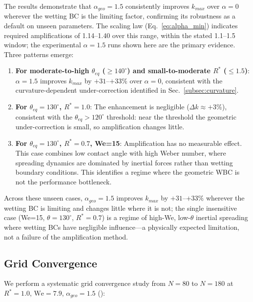 The results demonstrate that $\alpha_{geo}=1.5$ consistently improves $k_{max}$ over $\alpha=0$ wherever the wetting BC is the limiting factor, confirming its robustness as a default on unseen parameters. The scaling law (Eq.~\ref{eq:alpha_min}) indicates required amplifications of 1.14--1.40 over this range, within the stated 1.1--1.5 window; the experimental $\alpha=1.5$ runs shown here are the primary evidence. Three patterns emerge:

\begin{enumerate}
    \item \textbf{For moderate-to-high $\theta_{eq}$ ($\geq 140^\circ$) and small-to-moderate $R^*$ ($\leq 1.5$)}: $\alpha=1.5$ improves $k_{max}$ by $+31$--$+33\%$ over $\alpha=0$, consistent with the curvature-dependent under-correction identified in Sec.~\ref{subsec:curvature}.
    \item \textbf{For $\theta_{eq}=130^\circ$, $R^*=1.0$}: The enhancement is negligible ($\Delta k \approx +3\%$), consistent with the $\theta_{eq}>120^\circ$ threshold: near the threshold the geometric under-correction is small, so amplification changes little.
    \item \textbf{For $\theta_{eq}=130^\circ$, $R^*=0.7$, We=15}: Amplification has no measurable effect. This case combines low contact angle with high Weber number, where spreading dynamics are dominated by inertial forces rather than wetting boundary conditions. This identifies a regime where the geometric WBC is not the performance bottleneck.
\end{enumerate}

Across these unseen cases, $\alpha_{geo}=1.5$ improves $k_{max}$ by $+31$--$+33\%$ wherever the wetting BC is limiting and changes little where it is not; the single insensitive case (We=15, $\theta=130^\circ$, $R^*=0.7$) is a regime of high-We, low-$\theta$ inertial spreading where wetting BCs have negligible influence---a physically expected limitation, not a failure of the amplification method.

\subsection{Grid Convergence}\label{subsec:grid_convergence}

We perform a systematic grid convergence study from $N=80$ to $N=180$ at $R^*=1.0$, $\mathrm{We}=7.9$, $\alpha_{geo}=1.5$ ():

